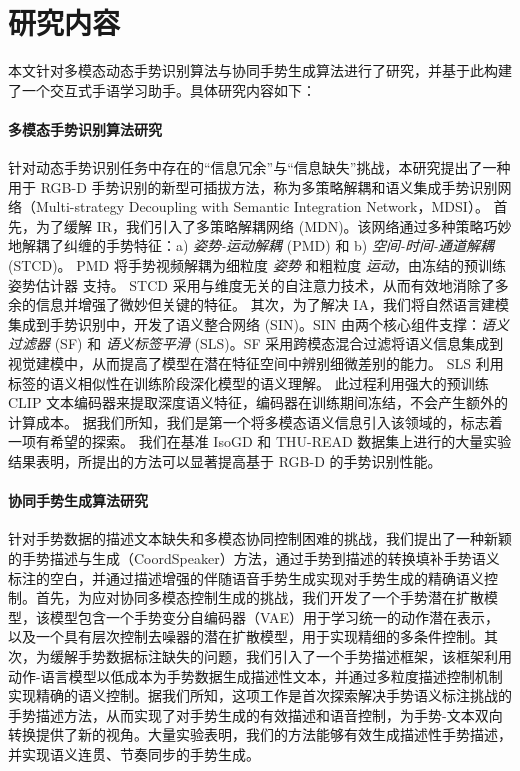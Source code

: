 \section{研究内容}

本文针对多模态动态手势识别算法与协同手势生成算法进行了研究，并基于此构建了一个交互式手语学习助手。具体研究内容如下：


\paragraph{多模态手势识别算法研究} 针对动态手势识别任务中存在的“信息冗余”与“信息缺失”挑战，本研究提出了一种用于 RGB-D 手势识别的新型可插拔方法，称为多策略解耦和语义集成手势识别网络（Multi-strategy Decoupling with Semantic Integration Network，MDSI）。
首先，为了缓解 IR，我们引入了多策略解耦网络 (MDN)。该网络通过多种策略巧妙地解耦了纠缠的手势特征：a) \emph{姿势-运动解耦} (PMD) 和 b) \emph{空间-时间-通道解耦} (STCD)。
PMD 将手势视频解耦为细粒度 \emph{姿势} 和粗粒度 \emph{运动}，由冻结的预训练姿势估计器 \cite{sun2019deep} 支持。
STCD 采用与维度无关的自注意力技术，从而有效地消除了多余的信息并增强了微妙但关键的特征。
其次，为了解决 IA，我们将自然语言建模集成到手势识别中，开发了语义整合网络 (SIN)。SIN 由两个核心组件支撑：\emph{语义过滤器} (SF) 和 \emph{语义标签平滑} (SLS)。SF 采用跨模态混合过滤将语义信息集成到视觉建模中，从而提高了模型在潜在特征空间中辨别细微差别的能力。
SLS 利用标签的语义相似性在训练阶段深化模型的语义理解。
此过程利用强大的预训练 CLIP 文本编码器来提取深度语义特征，编码器在训练期间冻结，不会产生额外的计算成本。
据我们所知，我们是第一个将多模态语义信息引入该领域的，标志着一项有希望的探索。
我们在基准 IsoGD 和 THU-READ 数据集上进行的大量实验结果表明，所提出的方法可以显著提高基于 RGB-D 的手势识别性能。

\paragraph{协同手势生成算法研究} 
针对手势数据的描述文本缺失和多模态协同控制困难的挑战，我们提出了一种新颖的手势描述与生成（CoordSpeaker）方法，通过手势到描述的转换填补手势语义标注的空白，并通过描述增强的伴随语音手势生成实现对手势生成的精确语义控制。首先，为应对协同多模态控制生成的挑战，我们开发了一个手势潜在扩散模型，该模型包含一个手势变分自编码器（VAE）用于学习统一的动作潜在表示，以及一个具有层次控制去噪器的潜在扩散模型，用于实现精细的多条件控制。其次，为缓解手势数据标注缺失的问题，我们引入了一个手势描述框架，该框架利用动作-语言模型以低成本为手势数据生成描述性文本，并通过多粒度描述控制机制实现精确的语义控制。据我们所知，这项工作是首次探索解决手势语义标注挑战的手势描述方法，从而实现了对手势生成的有效描述和语音控制，为手势-文本双向转换提供了新的视角。大量实验表明，我们的方法能够有效生成描述性手势描述，并实现语义连贯、节奏同步的手势生成。

